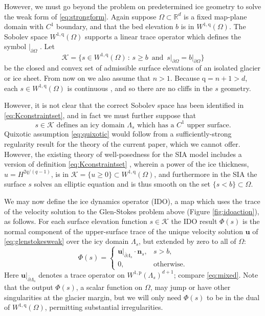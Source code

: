 \documentclass[letterpaper,final,12pt,reqno]{amsart}
\theoremstyle{claim}
\newcommand{\RR}{\mathbb{R}}
\newcommand{\bn}{\mathbf{n}}
\newcommand{\bu}{\mathbf{u}}
\newcommand{\pp}{{\text{p}}}
\newcommand{\qq}{{\text{q}}}
\numberwithin{equation}{section}
\numberwithin{figure}{section}
\numberwithin{table}{section}
\numberwithin{theorem}{section}
\begin{document}
However, we must go beyond the problem on predetermined ice geometry to solve the weak form of \eqref{eq:strongform}.  Again suppose $\Omega \subset \RR^d$ is a fixed map-plane domain with $C^1$ boundary, and that the bed elevation $b$ is in $W^{1,\qq}(\Omega)$.  The Sobolev space $W^{1,\qq}(\Omega)$ supports a linear trace operator which defines the symbol $|_{\partial \Omega}$ \cite[Section 5.5]{Evans2010}.  Let
\begin{equation}
\mathcal{K} = \{s \in W^{1,\qq}(\Omega) \,:\, s \ge b \, \text{ and } \, s\big|_{\partial\Omega} = b\big|_{\partial\Omega}\}  \label{eq:Kconstraintset}
\end{equation}
be the closed and convex set of admissible surface elevations of an isolated glacier or ice sheet.  From now on we also assume that $n>1$.  Because $\qq = n+1 > d$, each $s \in W^{1,\qq}(\Omega)$ is continuous \cite[Morrey's inequality, section 5.6.2]{Evans2010}, and so there are no cliffs in the $s$ geometry.

However, it is not clear that the correct Sobolev space has been identified in \eqref{eq:Kconstraintset}, and in fact we must further suppose that
\begin{equation}
s\in \mathcal{K} \text{ defines an icy domain } \Lambda_s \text{ which has a $C^1$ upper surface.} \label{eq:quixotic}
\end{equation}
Quixotic assumption \eqref{eq:quixotic} would follow from a sufficiently-strong regularity result for the theory of the current paper, which we cannot offer.  However, the existing theory of well-posedness for the SIA model includes a version of definition \eqref{eq:Kconstraintset} \cite{JouvetBueler2012}, wherein a power of the ice thickness, $u=H^{2q/(q-1)}$, is in $\mathcal{K} = \{u \ge 0\} \subset W^{1,\qq}(\Omega)$, and furthermore in the SIA the surface $s$ solves an elliptic equation and is thus smooth on the set $\{s<b\} \subset \Omega$.

We may now define the ice dynamics operator (IDO), a map which uses the trace of the velocity solution to the Glen-Stokes problem above (Figure \ref{fig:idoaction}), as follows.  For each surface elevation function $s \in \mathcal{K}$ the IDO result $\Phi(s)$ is the normal component of the upper-surface trace of the unique velocity solution $\bu$ of \eqref{eq:glenstokesweak} over the icy domain $\Lambda_s$, but extended by zero to all of $\Omega$:
\begin{equation}
\Phi(s) = \begin{cases} \bu|_{\overline{\partial} \Lambda_s} \cdot \bn_s, & s > b, \\
                        0, & \text{otherwise}. \end{cases} \label{eq:ido}
\end{equation}
Here $\bu|_{\overline{\partial} \Lambda_s}$ denotes a trace operator on $W^{1,\pp}(\Lambda_s)^{d+1}$; compare \eqref{eq:mixed}.  Note that the output $\Phi(s)$, a scalar function on $\Omega$, may jump or have other singularities at the glacier margin, but we will only need $\Phi(s)$ to be in the dual of $W^{1,\qq}(\Omega)$, permitting substantial irregularities.
\end{document}
